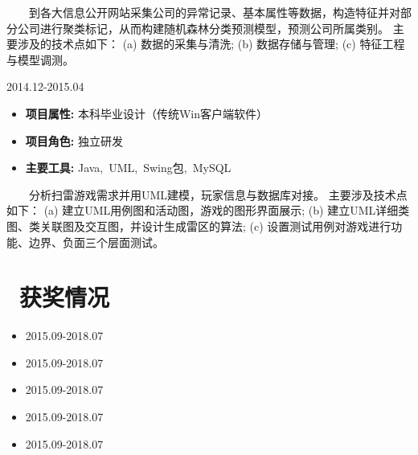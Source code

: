 \documentclass{resume}
\begin{document}
{\ \ \ \ 到各大信息公开网站采集公司的异常记录、基本属性等数据，构造特征并对部分公司进行聚类标记，从而构建随机森林分类预测模型，预测公司所属类别。
主要涉及的技术点如下：
(a) 数据的采集与清洗;
(b) 数据存储与管理;
(c) 特征工程与模型调测。
  
\medskip





                       {2014.12-2015.04}

\begin{itemize} [parsep=0.3ex]

\item  \textbf{ 项目属性: }      {本科毕业设计（传统Win客户端软件）}
\item   \textbf{ 项目角色: }        {独立研发}
\item    \textbf{ 主要工具: }       {Java,\ UML,\ Swing包,\ MySQL}

\end{itemize}


{\ \ \ \ 分析扫雷游戏需求并用UML建模，玩家信息与数据库对接。
主要涉及技术点如下：
(a) 建立UML用例图和活动图，游戏的图形界面展示;
(b) 建立UML详细类图、类关联图及交互图，并设计生成雷区的算法;
(c) 设置测试用例对游戏进行功能、边界、负面三个层面测试。 }
  
  \medskip










\section{   \faTrophy   \ 获奖情况}


\begin{itemize} [parsep=0.5ex]

\item   {}                                      {2015.09-2018.07}
\item   {}                                         {2015.09-2018.07}
\item   {}                                         {2015.09-2018.07}
\item   {}                                         {2015.09-2018.07}
\item   {}                                    {2015.09-2018.07}


\end{itemize}}
\end{document}
